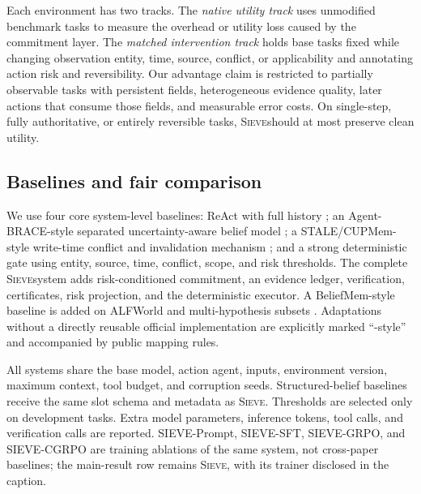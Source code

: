 \documentclass{article}
\newcommand{\method}{\textsc{Sieve}}
\begin{document}
Each environment has two tracks. The \emph{native utility track} uses unmodified benchmark tasks to measure the overhead or utility loss caused by the commitment layer. The \emph{matched intervention track} holds base tasks fixed while changing observation entity, time, source, conflict, or applicability and annotating action risk and reversibility. Our advantage claim is restricted to partially observable tasks with persistent fields, heterogeneous evidence quality, later actions that consume those fields, and measurable error costs. On single-step, fully authoritative, or entirely reversible tasks, \method should at most preserve clean utility.

\subsection{Baselines and fair comparison}

We use four core system-level baselines: ReAct with full history \citep{yao2023react}; an Agent-BRACE-style separated uncertainty-aware belief model \citep{singh2026agentbrace}; a STALE/CUPMem-style write-time conflict and invalidation mechanism \citep{chao2026stale}; and a strong deterministic gate using entity, source, time, conflict, scope, and risk thresholds. The complete \method system adds risk-conditioned commitment, an evidence ledger, verification, certificates, risk projection, and the deterministic executor. A BeliefMem-style baseline is added on ALFWorld and multi-hypothesis subsets \citep{liao2026beliefmem}. Adaptations without a directly reusable official implementation are explicitly marked ``-style'' and accompanied by public mapping rules.

All systems share the base model, action agent, inputs, environment version, maximum context, tool budget, and corruption seeds. Structured-belief baselines receive the same slot schema and metadata as \method. Thresholds are selected only on development tasks. Extra model parameters, inference tokens, tool calls, and verification calls are reported. SIEVE-Prompt, SIEVE-SFT, SIEVE-GRPO, and SIEVE-CGRPO are training ablations of the same system, not cross-paper baselines; the main-result row remains \method, with its trainer disclosed in the caption.
\end{document}
